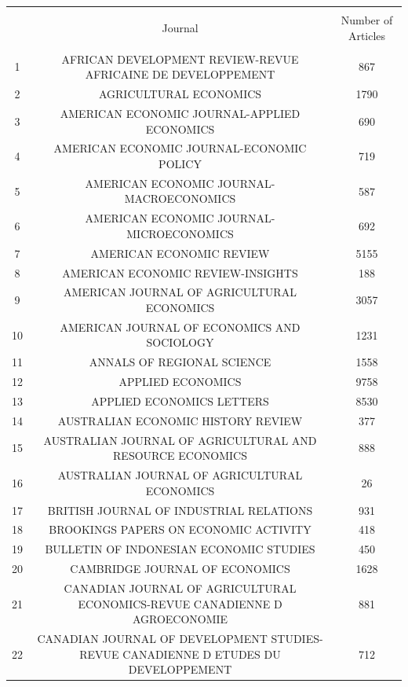 

\begin{tabular}{@{\extracolsep{5pt}} ccc} 
\\[-1.8ex]\hline 
\hline \\[-1.8ex] 
 & Journal & Number of Articles \\ 
\hline \\[-1.8ex] 
1 & AFRICAN DEVELOPMENT REVIEW-REVUE AFRICAINE DE DEVELOPPEMENT & 867 \\ 
2 & AGRICULTURAL ECONOMICS & 1790 \\ 
3 & AMERICAN ECONOMIC JOURNAL-APPLIED ECONOMICS & 690 \\ 
4 & AMERICAN ECONOMIC JOURNAL-ECONOMIC POLICY & 719 \\ 
5 & AMERICAN ECONOMIC JOURNAL-MACROECONOMICS & 587 \\ 
6 & AMERICAN ECONOMIC JOURNAL-MICROECONOMICS & 692 \\ 
7 & AMERICAN ECONOMIC REVIEW & 5155 \\ 
8 & AMERICAN ECONOMIC REVIEW-INSIGHTS & 188 \\ 
9 & AMERICAN JOURNAL OF AGRICULTURAL ECONOMICS & 3057 \\ 
10 & AMERICAN JOURNAL OF ECONOMICS AND SOCIOLOGY & 1231 \\ 
11 & ANNALS OF REGIONAL SCIENCE & 1558 \\ 
12 & APPLIED ECONOMICS & 9758 \\ 
13 & APPLIED ECONOMICS LETTERS & 8530 \\ 
14 & AUSTRALIAN ECONOMIC HISTORY REVIEW & 377 \\ 
15 & AUSTRALIAN JOURNAL OF AGRICULTURAL AND RESOURCE ECONOMICS & 888 \\ 
16 & AUSTRALIAN JOURNAL OF AGRICULTURAL ECONOMICS & 26 \\ 
17 & BRITISH JOURNAL OF INDUSTRIAL RELATIONS & 931 \\ 
18 & BROOKINGS PAPERS ON ECONOMIC ACTIVITY & 418 \\ 
19 & BULLETIN OF INDONESIAN ECONOMIC STUDIES & 450 \\ 
20 & CAMBRIDGE JOURNAL OF ECONOMICS & 1628 \\ 
21 & CANADIAN JOURNAL OF AGRICULTURAL ECONOMICS-REVUE CANADIENNE D AGROECONOMIE & 881 \\ 
22 & CANADIAN JOURNAL OF DEVELOPMENT STUDIES-REVUE CANADIENNE D ETUDES DU DEVELOPPEMENT & 712 \\ 

\end{tabular}
